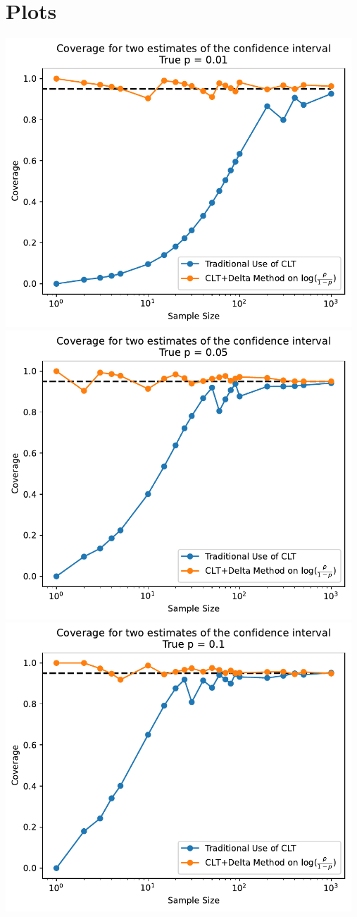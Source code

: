 \documentclass{article}
\begin{document}
\section*{Plots}
\includegraphics[width=13cm]{plot_0.pdf}
\includegraphics[width=13cm]{plot_1.pdf}
\includegraphics[width=13cm]{plot_2.pdf}
\end{document}
